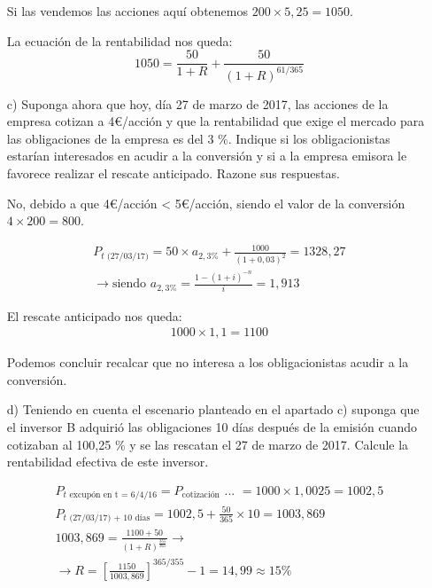 \begin{enumerate}
    
    Si las vendemos las acciones aquí obtenemos $200 \times 5,25 = 1050$.


    La ecuación de la rentabilidad nos queda:
    \begin{equation*}
        1050 = \frac{50}{1+R} + \frac{50}{(1+R)^{61/365}}
    \end{equation*}


    \item[c)] Suponga ahora que hoy, día 27 de marzo de 2017, las acciones de la empresa cotizan a 4€/acción y que la rentabilidad que exige el mercado para las obligaciones de la empresa es del 3 \%. Indique si los obligacionistas estarían interesados en acudir a la conversión y si a la empresa emisora le favorece realizar el rescate anticipado. Razone sus respuestas.
    
    No, debido a que 4€/acción < 5€/acción, siendo el valor de la conversión $4\times200 = 800$.

    \begin{align*}
        P_{t\text{ (27/03/17)}} = 50 \times a_{2,3\%} + \frac{1000}{(1+0,03)^2} = 1328,27 \\
        \rightarrow \text{siendo }a_{2,3\%} = \frac{1-(1+i)^{-n}}{i} = 1,913
    \end{align*}

    El rescate anticipado nos queda: 
    \begin{align*}
        1000 \times 1,1 = 1100
    \end{align*}

    Podemos concluir recalcar que no interesa a los obligacionistas acudir a la conversión.


    \item[d)] Teniendo en cuenta el escenario planteado en el apartado c) suponga que el inversor B adquirió las obligaciones 10 días después de la emisión cuando cotizaban al 100,25 \% y se las rescatan el 27 de marzo de 2017. Calcule la rentabilidad efectiva de este inversor.
    
    \begin{align*}
        P_{t\text{ excupón en t = 6/4/16}} = P_{\text{cotización}} \text{ ... } = 1000 \times 1,0025 = 1002,5 \\
        P_{t\text{ (27/03/17) + 10 días}} = 1002,5 + \frac{50}{365} \times 10 = 1003,869 \\
        1003,869 = \frac{1100 + 50}{(1+R)^{\frac{355}{365}}} \rightarrow \\
        \rightarrow R = \left[\frac{1150}{1003,869}\right]^{365/355} - 1 = 14,99 \approx 15\%
    \end{align*}

\end{enumerate}

